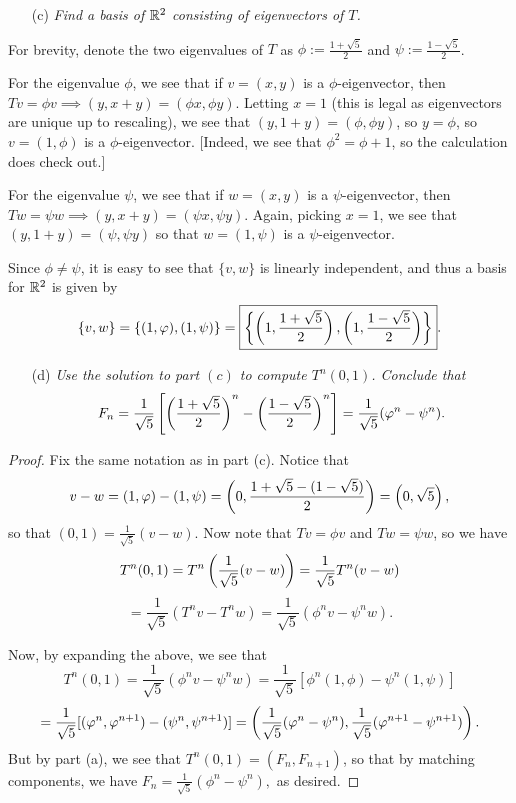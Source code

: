 \documentclass{article}
\begin{document}
\begin{itemize}
    \item[(c)] \textit{Find a basis of $\mathbb R^2$ consisting of eigenvectors of $T$.}
\end{itemize}
\begin{solution}
For brevity, denote the two eigenvalues of $T$ as $\phi := \frac{1+\sqrt 5}{2}$ and $\psi := \frac{1-\sqrt 5}{2}$.

For the eigenvalue $\phi$, we see that if $v = (x,y)$ is a $\phi$-eigenvector, then $Tv = \phi v \implies (y, x+y) = (\phi x, \phi y)$. Letting $x = 1$ (this is legal as eigenvectors are unique up to rescaling), we see that $(y, 1+y) = (\phi, \phi y)$, so $ y = \phi$, so $v = (1, \phi)$ is a $\phi$-eigenvector. [Indeed, we see that $\phi^2 = \phi +1$, so the calculation does check out.]

For the eigenvalue $\psi$, we see that if $w = (x,y)$ is a $\psi$-eigenvector, then $Tw = \psi w\implies (y, x+y) = (\psi x, \psi y)$. Again, picking $x = 1$, we see that $(y, 1+y) = (\psi, \psi y)$ so that $w = (1, \psi)$ is a $\psi$-eigenvector.

Since $\phi\neq \psi$, it is easy to see that $\{v, w\}$ is linearly independent, and thus a basis for $\mathbb R^2$ is given by
$$\left\{v, w\right\} = \left\{(1, \varphi), (1,\psi)\right\} = \boxed{\left\{\left(1, \frac{1+\sqrt 5}2 \right), \left(1, \frac{1-\sqrt 5}2 \right)\right\}}.$$
\end{solution}

\begin{itemize}
    \item[(d)] \textit{Use the solution to part $(c)$ to compute $T^n(0, 1)$. Conclude that}
    $$F_n = \frac 1{\sqrt 5}\left[
    \left(\frac{1+\sqrt 5}2 \right)^n - \left(\frac{1-\sqrt 5}2 \right)^n
    \right] = \frac 1{\sqrt 5}(\varphi^n-\psi^n).$$
\end{itemize}
\begin{proof}
Fix the same notation as in part (c). Notice that
$$v-w = (1, \varphi) - (1,\psi) = \left(0, \frac{1+\sqrt 5-(1-\sqrt 5)}{2} \right) = \left(0, \sqrt 5 \right),$$
so that $(0, 1)= \frac 1{\sqrt 5}(v - w).$ Now note that $Tv = \phi v$ and $Tw = \psi w$, so we have
$$T^n(0, 1) = T^n\left(\frac 1{\sqrt 5}(v-w) \right) = \frac 1{\sqrt 5}T^n(v-w)$$
$$= \frac 1{\sqrt 5}(T^nv - T^nw) = \boxed{\frac 1{\sqrt 5}(\phi^n v - \psi^n w)}.$$

Now, by expanding the above, we see that
$$T^n(0, 1)= \frac 1{\sqrt 5}(\phi^n v - \psi^nw) = \frac 1{\sqrt 5}[\phi^n(1, \phi) - \psi^n(1, \psi)]$$
$$ = \frac{1}{\sqrt 5}[( \varphi^n, \varphi^{n+1}) - (\psi^n, \psi^{n+1})]=\left(
\frac 1{\sqrt 5}(\varphi^n-\psi^n), \frac 1{\sqrt 5}(\varphi^{n+1} - \psi^{n+1})
 \right).$$
But by part (a), we see that $T^n(0, 1) = (F_n, F_{n+1})$, so that by matching components, we have
$F_n =\frac 1{\sqrt 5}(\phi^n-\psi^n),$
as desired.
\end{proof}
\end{document}

